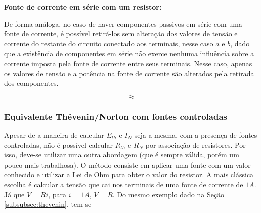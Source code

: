 \documentclass{article}
\numberwithin{equation}{section}
\newlength\Colsep
\begin{document}
\vspace{3mm}

\textbf{\small{\textbullet} Fonte de corrente em série com um resistor:}

\noindent De forma análoga, no caso de haver componentes passivos em série com uma fonte de corrente, é possível retirá-los sem alteração dos valores de tensão e corrente do restante do circuito conectado aos terminais, nesse caso $a$ e $b$, dado que a existência de componentes em série não exerce nenhuma influência sobre a corrente imposta pela fonte de corrente entre seus terminais. Nesse caso, apenas os valores de tensão e a potência na fonte de corrente são alterados pela retirada dos componentes.

\noindent\begin{minipage}{\textwidth}
\begin{minipage}[c][4cm][c]{\dimexpr0.45\textwidth-0.5\Colsep\relax}
    \begin{center}
    \end{center}
\end{minipage} \hfill
\begin{minipage}[c][4cm][c]{\dimexpr0.1\textwidth-0.5\Colsep\relax}
    $$\approx$$
\end{minipage} \hfill
\begin{minipage}[c][4cm][c]{\dimexpr0.45\textwidth-0.5\Colsep\relax}
    \begin{center}
    \end{center}
\end{minipage}
\end{minipage}

\subsubsection{Equivalente Thévenin/Norton com fontes controladas}
\label{subsubsec:thfontecontrolada}
Apesar de a maneira de calcular $E_{th}$ e $I_N$ seja a mesma, com a presença de fontes controladas, não é possível calcular $R_{th}$ e $R_N$ por associação de resistores. Por isso, deve-se utilizar uma outra abordagem (que é sempre válida, porém um pouco mais trabalhosa). O método consiste em aplicar uma fonte com um valor conhecido e utilizar a Lei de Ohm para obter o valor do resistor. A mais clássica escolha é calcular a tensão que cai nos terminais de uma fonte de corrente de $1A$. Já que $V=Ri$, para $i=1A$, $V=R$. Do mesmo exemplo dado na Seção \ref{subsubsec:thevenin}, tem-se
\end{document}
